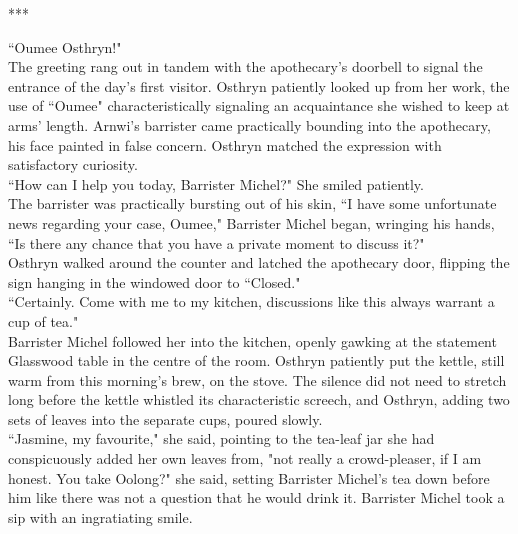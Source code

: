

\begin{center}
    ***
\end{center}

``Oumee Osthryn!"\\
The greeting rang out in tandem with the apothecary's doorbell to signal the entrance of the day's first visitor.
Osthryn patiently looked up from her work, the use of ``Oumee" characteristically signaling an acquaintance she wished to keep at arms' length.
Arnwi's barrister came practically bounding into the apothecary, his face painted in false concern. 
Osthryn matched the expression with satisfactory curiosity.\\
``How can I help you today, Barrister Michel?" She smiled patiently.\\
The barrister was practically bursting out of his skin, ``I have some unfortunate news regarding your case, Oumee," Barrister Michel began, wringing his hands, ``Is there any chance that you have a private moment to discuss it?"\\

Osthryn walked around the counter and latched the apothecary door, flipping the sign hanging in the windowed door to ``Closed."\\
``Certainly. Come with me to my kitchen, discussions like this always warrant a cup of tea."\\
Barrister Michel followed her into the kitchen, openly gawking at the statement Glasswood table in the centre of the room.
Osthryn patiently put the kettle, still warm from this morning's brew, on the stove.
The silence did not need to stretch long before the kettle whistled its characteristic screech, and Osthryn, adding two sets of leaves into the separate cups, poured slowly.\\

``Jasmine, my favourite," she said, pointing to the tea-leaf jar she had conspicuously added her own leaves from, "not really a crowd-pleaser, if I am honest. You take Oolong?" she said, setting Barrister Michel's tea down before him like there was not a question that he would drink it.
Barrister Michel took a sip with an ingratiating smile.\\

